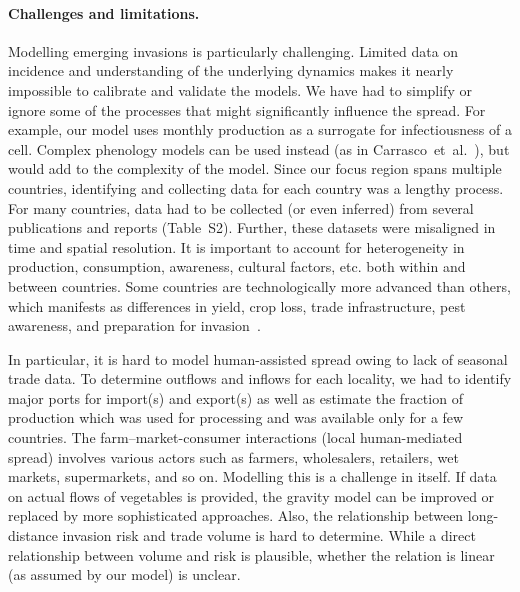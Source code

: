 \documentclass[11pt]{article}
\theoremstyle{definition}
\begin{document}

\paragraph{Challenges and limitations.} Modelling emerging invasions is
particularly challenging. Limited data on incidence and understanding of
the underlying dynamics makes it nearly impossible to calibrate and
validate the models.   We have had to simplify or ignore some of the
processes that might significantly influence the spread.  For example, our
model uses monthly production as a surrogate for infectiousness of a cell.
Complex phenology models can be used instead (as in
Carrasco~et~al.~\cite{carrasco2010unveiling}), but would add to the
complexity of the model.
Since our focus region spans multiple countries, identifying and collecting
data for each country was a lengthy process. For many countries, data had
to be collected (or even inferred) from several publications and reports
(Table~S2). Further, these datasets were misaligned in
time and spatial resolution.  It is important to account for heterogeneity
in production, consumption, awareness, cultural factors, etc. both within
and between countries.  Some countries are technologically more advanced
than others, which manifests as differences in yield, crop loss, trade
infrastructure, pest awareness, and preparation for
invasion~\cite{early2016global}.

In particular, it is hard to model human-assisted spread owing to lack of
seasonal trade data. To determine outflows and inflows for each locality,
we had to identify major ports for import(s) and export(s) as well as
estimate the fraction of production which was used for processing and was
available only for a few countries. The farm--market-consumer interactions
(local human-mediated spread) involves various actors such as farmers,
wholesalers, retailers, wet markets, supermarkets, and so on. Modelling
this is a challenge in itself. If data on actual flows of vegetables is
provided, the gravity model can be improved or replaced by more
sophisticated approaches. Also, the relationship between long-distance
invasion risk and trade volume is hard to determine. While a direct
relationship between volume and risk is plausible, whether the relation is
linear (as assumed by our model) is unclear.
\end{document}
